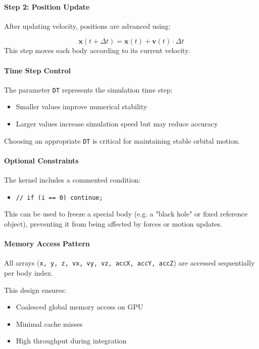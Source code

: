 \documentclass[12pt]{article}
\begin{document}
\paragraph{Step 2: Position Update}

After updating velocity, positions are advanced using:

\[
\mathbf{x}(t + \Delta t) = \mathbf{x}(t) + \mathbf{v}(t) \cdot \Delta t
\]
This step moves each body according to its current velocity.

\paragraph{Time Step Control}

The parameter \texttt{DT} represents the simulation time step:

\begin{itemize}
    \item Smaller values improve numerical stability
    \item Larger values increase simulation speed but may reduce accuracy
\end{itemize}

Choosing an appropriate \texttt{DT} is critical for maintaining stable orbital motion.

\paragraph{Optional Constraints}

The kernel includes a commented condition:

\begin{itemize}
    \item \texttt{// if (i == 0) continue;}
\end{itemize}

This can be used to freeze a special body (e.g. a "black hole" or fixed reference object),
preventing it from being affected by forces or motion updates.

\paragraph{Memory Access Pattern}

All arrays (\texttt{x, y, z, vx, vy, vz, accX, accY, accZ}) are accessed sequentially per body index.

This design ensures:

\begin{itemize}
    \item Coalesced global memory access on GPU
    \item Minimal cache misses
    \item High throughput during integration
\end{itemize}
\end{document}
